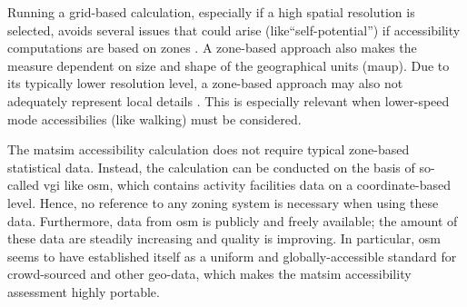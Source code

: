 Running a grid-based calculation, especially if a high spatial resolution is selected, avoids several issues
that could arise (like``self-potential'') if accessibility computations are based on zones
\citep[see, e.g.,][]{NicolaiNagelHiResAccessibilityMethod}. A zone-based approach also makes the 
measure dependent on size and shape of the geographical units (\cf \gls{maup}). 
Due to its typically lower resolution level, a zone-based approach may also not adequately represent local details
\citep{Kwan1998PointBasedAccessibility}. This is especially relevant
when lower-speed mode accessibilies (like walking) must be considered.

The \gls{matsim} accessibility calculation does not require typical zone-based statistical data. Instead, the
calculation can be conducted on the basis of so-called \gls{vgi} like \gls{osm}, which contains
activity facilities data on a coordinate-based level. Hence, no reference to any zoning
system is necessary when using these data. Furthermore, data from \gls{osm} is publicly and freely available; 
the amount of these data are steadily increasing and quality is improving. In particular, \gls{osm} seems to have 
established itself as a uniform and globally-accessible standard for crowd-sourced and other geo-data, 
which makes the \gls{matsim} accessibility assessment highly portable.

